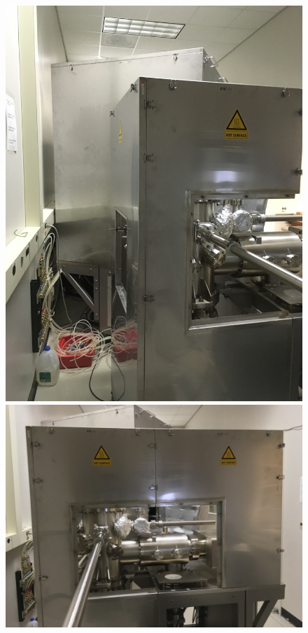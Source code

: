 \begin{enumerate}
\begin{figure}[H]
\begin{minipage}[c]{0.33\linewidth}
		\includegraphics[width=1\textwidth, angle=270]{panels2.jpg}
	\end{minipage}\hfill
	\begin{minipage}[c]{0.33\linewidth}
		\centering
		\includegraphics[width=1\textwidth]{panels3.jpg}

\end{minipage}
\end{figure}
\end{enumerate}
